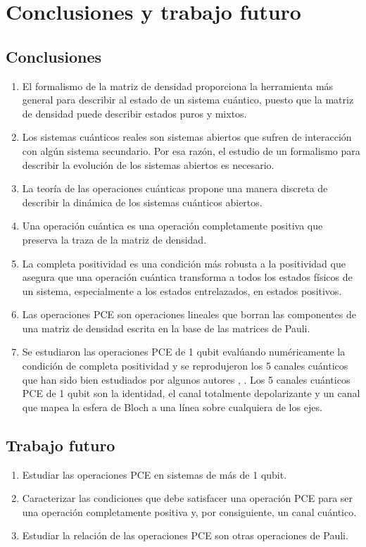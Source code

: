 \chapter{Conclusiones y trabajo futuro}
\section{Conclusiones}
\begin{enumerate}
\item El formalismo de la matriz de densidad proporciona la herramienta 
más general para describir al estado de un sistema cuántico, 
puesto que la matriz de densidad puede describir estados puros y mixtos.
\item Los sistemas cuánticos reales son sistemas abiertos que sufren
de interacción con algún sistema secundario. Por esa razón, el estudio 
de un formalismo para describir la evolución de los sistemas abiertos
es necesario.
\item La teoría de las operaciones cuánticas propone una manera
discreta de describir la dinámica de los sistemas cuánticos abiertos.
\item Una operación cuántica es una operación completamente positiva 
que preserva la traza de la matriz de densidad. 
\item La completa positividad es una condición más robusta a la 
positividad que asegura que una operación cuántica transforma
a todos los estados físicos de un sistema, especialmente a los estados 
entrelazados, en estados positivos.
\item Las operaciones PCE son operaciones lineales que borran las 
componentes de una matriz de densidad escrita en la base de las 
matrices de Pauli.
\item Se estudiaron las operaciones PCE de 1 qubit evalúando numéricamente
la condición de completa positividad y se reprodujeron los 5 canales cuánticos
que han sido bien estudiados por algunos autores
\cite{nielsen_chuang_2011},
\cite{bengtsson_zyczkowski_2017}. Los 5 canales cuánticos PCE 
de 1 qubit son la identidad, el canal totalmente depolarizante y 
un canal que mapea la esfera de Bloch a una línea sobre cualquiera de los ejes.
\end{enumerate}

\pagebreak 

\section{Trabajo futuro}
\begin{enumerate}
\item Estudiar las operaciones PCE en sistemas de más de 1 qubit.
\item Caracterizar las condiciones que debe satisfacer una operación 
PCE para ser una operación completamente positiva y, por consiguiente,
un canal cuántico.
\item Estudiar la relación de las operaciones PCE son otras operaciones 
de Pauli. 
\end{enumerate}